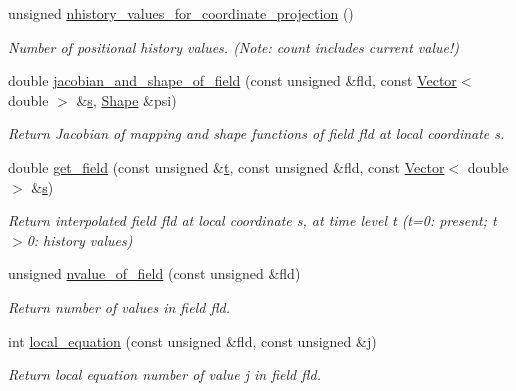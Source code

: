 \begin{DoxyCompactItemize}
unsigned \hyperlink{classoomph_1_1ProjectableCrouzeixRaviartElement_a95661958f80183560ddd50bb201a0532}{nhistory\+\_\+values\+\_\+for\+\_\+coordinate\+\_\+projection} ()
\begin{DoxyCompactList}\small\item\em Number of positional history values. (Note\+: count includes current value!) \end{DoxyCompactList}\item 
double \hyperlink{classoomph_1_1ProjectableCrouzeixRaviartElement_a91b2d0d2f6cb0fdfe3cd8d4f93373b05}{jacobian\+\_\+and\+\_\+shape\+\_\+of\+\_\+field} (const unsigned \&fld, const \hyperlink{classoomph_1_1Vector}{Vector}$<$ double $>$ \&\hyperlink{cfortran_8h_ab7123126e4885ef647dd9c6e3807a21c}{s}, \hyperlink{classoomph_1_1Shape}{Shape} \&psi)
\begin{DoxyCompactList}\small\item\em Return Jacobian of mapping and shape functions of field fld at local coordinate s. \end{DoxyCompactList}\item 
double \hyperlink{classoomph_1_1ProjectableCrouzeixRaviartElement_a7a344f2a19106f7c46f75d97c2cc5afd}{get\+\_\+field} (const unsigned \&\hyperlink{cfortran_8h_af6f0bd3dc13317f895c91323c25c2b8f}{t}, const unsigned \&fld, const \hyperlink{classoomph_1_1Vector}{Vector}$<$ double $>$ \&\hyperlink{cfortran_8h_ab7123126e4885ef647dd9c6e3807a21c}{s})
\begin{DoxyCompactList}\small\item\em Return interpolated field fld at local coordinate s, at time level t (t=0\+: present; t$>$0\+: history values) \end{DoxyCompactList}\item 
unsigned \hyperlink{classoomph_1_1ProjectableCrouzeixRaviartElement_adee290d9544673529406381ccdfbe818}{nvalue\+\_\+of\+\_\+field} (const unsigned \&fld)
\begin{DoxyCompactList}\small\item\em Return number of values in field fld. \end{DoxyCompactList}\item 
int \hyperlink{classoomph_1_1ProjectableCrouzeixRaviartElement_a1cea4dd9a75e28f84b1b7ab71a5c64eb}{local\+\_\+equation} (const unsigned \&fld, const unsigned \&j)
\begin{DoxyCompactList}\small\item\em Return local equation number of value j in field fld. \end{DoxyCompactList}\end{DoxyCompactItemize}
